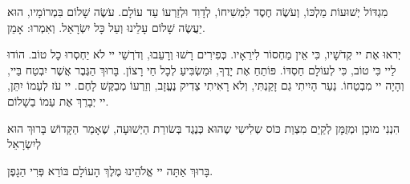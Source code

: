 \vspace{1em}

מִגְדּוֹל יְשׁוּעוֹת מַלְכּוֹ, וְעֹשֶׂה חֶסֶד לִמְשִׁיחוֹ, לְדָוִד וּלְזַרְעוֹ עַד עוֹלָם. עֹשֶׂה שָׁלוֹם בִּמְרוֹמָיו, הוּא יַעֲשֶׂה שָׁלוֹם עָלֵינוּ וְעַל כָּל יִשְׂרָאַל. וְאִמְרוּ: אָמֵן.

יְראוּ אֶת יי קְדֹשָׁיו, כִּי אֵין מַחְסוֹר לִירֵאָיו. כְּפִירִים רָשׁוּ וְרָעֵבוּ, וְדֹרְשֵׁי יי לֹא יַחְסְרוּ כָל טוֹב. הוֹדוּ לַיי כִּי טוֹב, כִּי לְעוֹלָם חַסְדּוֹ. פּוֹתֵחַ אֶת יָדֶךָ, וּמַשְׂבִּיעַ לְכָל חַי רָצוֹן. בָּרוּךְ הַגֶּבֶר אֲשֶׁר יִבְטַח בַּיי, וְהָיָה יי מִבְטַחוֹ. נַעַר הָיִיתִי גַם זָקַנְתִּי, וְלֹא רָאִיתִי צַדִיק נֶעֱזָב, וְזַרְעוֹ מְבַקֶּשׁ לָחֶם. יי עֹז לְעַמוֹ יִתֵּן, יי יְבָרֵךְ אֶת עַמוֹ בַשָׁלוֹם.

\vspace{1em}


הִנְנִי מוּכָן וּמְזֻמָּן לְקַיֵם מִצְוַת כּוֹס שְלִישִי שֶהוּא כְּנֶגֶד בְּשׂורַת הַיְשׁוּעָה, שֶׁאָמַר הַקָּדוֹשׁ בָּרוּךְ הוּא לְיִשְׂרָאֵל 

בָּרוּךְ אַתָּה יי אֱלֹהֵינוּ מֶלֶךְ הָעוֹלָם בּוֹרֵא פְּרִי הַגָפֶן.


\break